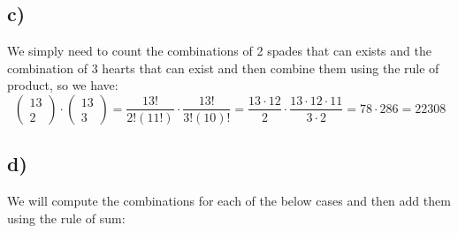 \documentclass{article}
\begin{document}
\subsection*{c)}
We simply need to count the combinations of 2 spades that can exists and the combination of 3 hearts that can exist and then combine them using the rule of product, so we have: $$\begin{pmatrix}
    13\\2
\end{pmatrix}\cdot \begin{pmatrix}
    13\\3
\end{pmatrix}=\frac{13!}{2!(11!)}\cdot \frac{13!}{3!(10)!}=\frac{13\cdot 12}{2}\cdot \frac{13\cdot 12\cdot 11}{3\cdot 2}=78\cdot 286=\boxed{22308}$$
\subsection*{d)}
We will compute the combinations for each of the below cases and then add them using the rule of sum: 
\end{document}
